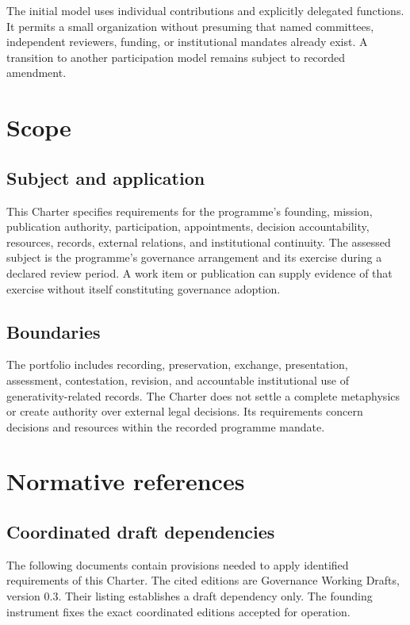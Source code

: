 \documentclass[11pt,a4paper]{article}
\begin{document}
The initial model uses individual contributions and explicitly delegated functions. It permits a small organization without presuming that named committees, independent reviewers, funding, or institutional mandates already exist. A transition to another participation model remains subject to recorded amendment.

\GSPmainmatter
\section{Scope}
\subsection{Subject and application}
This Charter specifies requirements for the programme's founding, mission, publication authority, participation, appointments, decision accountability, resources, records, external relations, and institutional continuity. The assessed subject is the programme's governance arrangement and its exercise during a declared review period. A work item or publication can supply evidence of that exercise without itself constituting governance adoption.


\subsection{Boundaries}
The portfolio includes recording, preservation, exchange, presentation, assessment, contestation, revision, and accountable institutional use of generativity-related records. The Charter does not settle a complete metaphysics or create authority over external legal decisions. Its requirements concern decisions and resources within the recorded programme mandate.


\section{Normative references}
\subsection{Coordinated draft dependencies}
The following documents contain provisions needed to apply identified requirements of this Charter. The cited editions are Governance Working Drafts, version 0.3. Their listing establishes a draft dependency only. The founding instrument fixes the exact coordinated editions accepted for operation.
\end{document}
